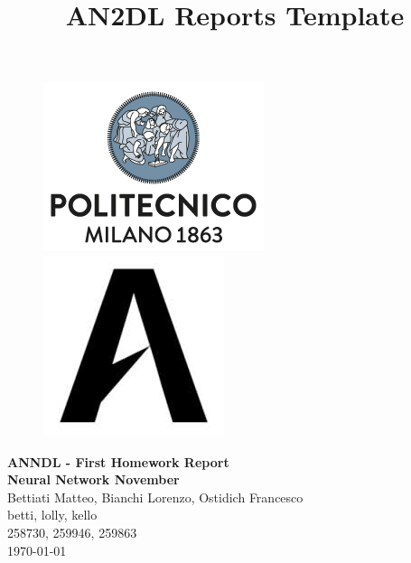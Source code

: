 \documentclass[11pt]{article}
\title{AN2DL Reports Template}
\begin{document}
    
    \begin{figure}[H]
        \raggedright
        \includegraphics[scale=0.4]{images/polimi.png} \hfill \includegraphics[scale=0.3]{images/airlab.jpeg}
    \end{figure}
    
    \vspace{5mm}
    
    \begin{center}
        {\Large \textbf{ANNDL - First Homework Report}}\\
        \vspace{2mm}
        {\Large \textbf{Neural Network November}}\\
        \vspace{2mm}
        {\large Bettiati Matteo,}
        {\large Bianchi Lorenzo,}
        {\large Ostidich Francesco}\\
        \vspace{2mm}
        {betti,}
        {lolly,}
        {kello}\\
        \vspace{2mm}
        {258730,}
        {259946,}
        {259863}\\
        \vspace{5mm}
        \today
    \end{center}   
    \vspace{5mm}
    
\end{document}
